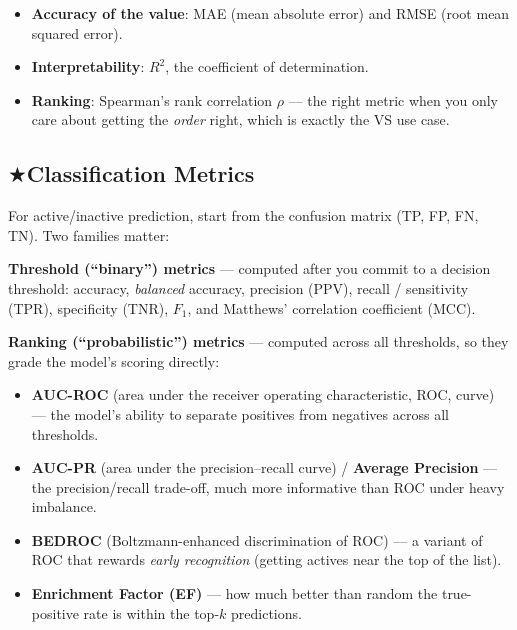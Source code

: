 \documentclass[11pt, oneside]{book}
\makeatletter
\newcommand{\starglyph}{\textcolor{stargold}{\ensuremath{\bigstar}}}
\newcommand{\starsec}[1]{%
  \texorpdfstring{\starglyph\hspace{0.4em}\textcolor{star@frame}{#1}}{#1}}
\makeatother
\begin{document}
\begin{itemize}
  \item \textbf{Accuracy of the value}: MAE (mean absolute error) and RMSE (root
        mean squared error).
  \item \textbf{Interpretability}: $R^2$, the coefficient of determination.
  \item \textbf{Ranking}: Spearman's rank correlation $\rho$ --- the right metric
        when you only care about getting the \emph{order} right, which is exactly
        the VS use case.
\end{itemize}

\subsection{\starsec{Classification Metrics}}

For active/inactive prediction, start from the confusion matrix (TP, FP, FN, TN).
Two families matter:

\textbf{Threshold (``binary'') metrics} --- computed after you commit to a decision
threshold: accuracy, \emph{balanced} accuracy, precision (PPV), recall /
sensitivity (TPR), specificity (TNR), $F_1$, and Matthews' correlation coefficient
(MCC).

\textbf{Ranking (``probabilistic'') metrics} --- computed across all thresholds, so
they grade the model's scoring directly:

\begin{itemize}
  \item \textbf{AUC-ROC} (area under the receiver operating characteristic, ROC,
        curve) --- the model's ability to separate positives from
        negatives across all thresholds.
  \item \textbf{AUC-PR} (area under the precision--recall curve) /
        \textbf{Average Precision} --- the precision/recall
        trade-off, much more informative than ROC under heavy imbalance.
  \item \textbf{BEDROC} (Boltzmann-enhanced discrimination of ROC) --- a variant of
        ROC that rewards \emph{early recognition}
        (getting actives near the top of the list).
  \item \textbf{Enrichment Factor (EF)} --- how much better than random the true-positive
        rate is within the top-$k$ predictions.
\end{itemize}

\newpage
\end{document}
